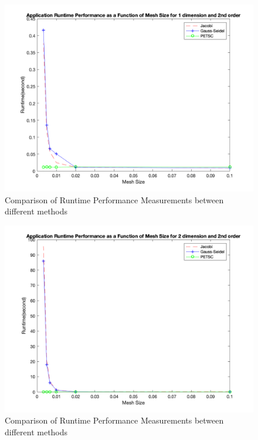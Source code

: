 \documentclass{article}
\begin{document}
\begin{figure}
  \includegraphics[width=\linewidth]{figure_11}
  \caption{Comparison of Runtime Performance Measurements between different methods}
\end{figure}

\begin{figure}
  \includegraphics[width=\linewidth]{figure_12}
  \caption{Comparison of Runtime Performance Measurements between different methods}
\end{figure}
\end{document}

